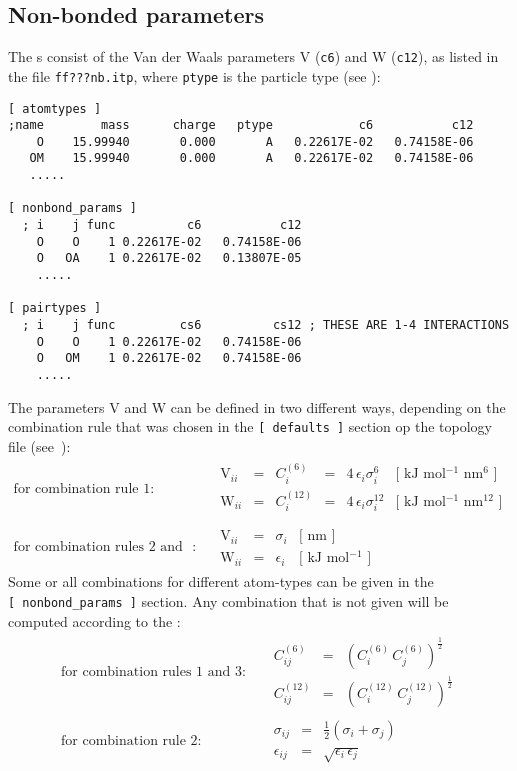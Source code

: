 \subsection{Non-bonded parameters}
\label{subsec:nbpar}
The s consist of the Van der Waals parameters
V ({\tt c6}) and W ({\tt c12}), as listed in the file {\tt ff???nb.itp},
where {\tt ptype} is the particle type (see ):
{\small\begin{verbatim}
[ atomtypes ]
;name        mass      charge   ptype            c6           c12
    O    15.99940       0.000       A   0.22617E-02   0.74158E-06
   OM    15.99940       0.000       A   0.22617E-02   0.74158E-06
   .....

[ nonbond_params ]
  ; i    j func          c6           c12
    O    O    1 0.22617E-02   0.74158E-06
    O   OA    1 0.22617E-02   0.13807E-05
    .....

[ pairtypes ]
  ; i    j func         cs6          cs12 ; THESE ARE 1-4 INTERACTIONS
    O    O    1 0.22617E-02   0.74158E-06
    O   OM    1 0.22617E-02   0.74158E-06
    .....
\end{verbatim}}
The parameters V and W can be defined in two different ways, depending on
the combination rule that was chosen in the {\tt [~defaults~]} section
op the topology file (see~):
\begin{eqnarray}
\mbox{for combination rule 1}: & &
\begin{array}{llllll}
  \mbox{V}_{ii} & = & C^{(6)}_{i}  & = & 4\,\epsilon_i\sigma_i^{6} &
  \mbox{[ kJ mol$^{-1}$ nm$^{6}$ ]}\\
  \mbox{W}_{ii} & = & C^{(12)}_{i} & = & 4\,\epsilon_i\sigma_i^{12} &
  \mbox{[ kJ mol$^{-1}$ nm$^{12}$ ]}\\
\end{array}
\\
\mbox{for combination rules 2 and 3}: & &
\begin{array}{llll}
  \mbox{V}_{ii} & = & \sigma_i   & \mbox{[ nm ]} \\
  \mbox{W}_{ii} & = & \epsilon_i & \mbox{[ kJ mol$^{-1}$ ]}
\end{array}
\end{eqnarray}
Some or all combinations for different atom-types can be given in
the {\tt [~nonbond\_params~]} section. Any combination that is
not given will be 
computed according to the :
\begin{eqnarray}
\mbox{for combination rules 1 and 3}: & &
\begin{array}{lll}
  C^{(6)}_{ij}  & = & \left(C^{(6)}_i\,C^{(6)}_j\right)^{\frac{1}{2}} \\
  C^{(12)}_{ij} & = & \left(C^{(12)}_i\,C^{(12)}_j\right)^{\frac{1}{2}}
\end{array}
\\
\mbox{for combination rule 2}: & &
\begin{array}{lll}
  \sigma_{ij}   & = & \frac{1}{2}(\sigma_i+\sigma_j) \\
  \epsilon_{ij} & = & \sqrt{\epsilon_i\,\epsilon_j}
\end{array}
\end{eqnarray}

